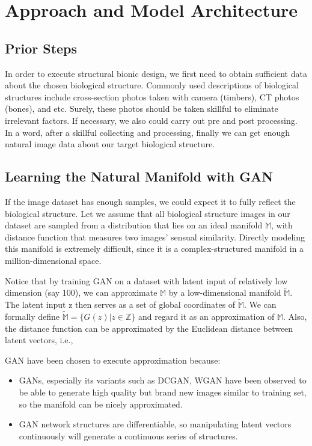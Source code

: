 \chapter{Approach and Model Architecture}

\section{Prior Steps}
In order to execute structural bionic design, we first need to obtain sufficient data about the chosen biological structure. Commonly used descriptions of biological structures include cross-section photos taken with camera (timbers), CT photos (bones), and etc. Surely, these photos should be taken skillful to eliminate irrelevant factors. If necessary, we also could carry out pre and post processing. In a word, after a skillful collecting and processing, finally we can get enough natural image data about our target biological structure.

\section{Learning the Natural Manifold with GAN}


If the image dataset has enough samples, we could expect it to fully reflect the biological structure. Let we assume that all biological structure images in our dataset are sampled from a distribution that lies on an ideal manifold $\mathbb{M}$, with distance function that measures two images’ sensual similarity. Directly modeling this manifold is extremely difficult, since it is a complex-structured manifold in a million-dimensional space. 

Notice that by training GAN on a dataset with latent input of relatively low dimension (say 100), we can approximate $\mathbb{M}$ by a low-dimensional manifold $\widetilde{\mathbb{M}}$. The latent input z then serves as a set of global coordinates of $\widetilde{\mathbb{M}}$. We can formally define $\widetilde{\mathbb{M}} = \{G(z)|z\in\mathbb{Z}\}$ and regard it as an approximation of $\mathbb{M}$. Also, the distance function can be approximated by the Euclidean distance between latent vectors, i.e., 

GAN have been chosen to execute approximation because: 
\begin{itemize}
\item GANs, especially its variants such as DCGAN, WGAN have been observed to be able to generate high quality but brand new images similar to training set, so the manifold can be nicely approximated. 
\item GAN network structures are differentiable, so manipulating latent vectors continuously will generate a continuous series of structures.
\end{itemize}
